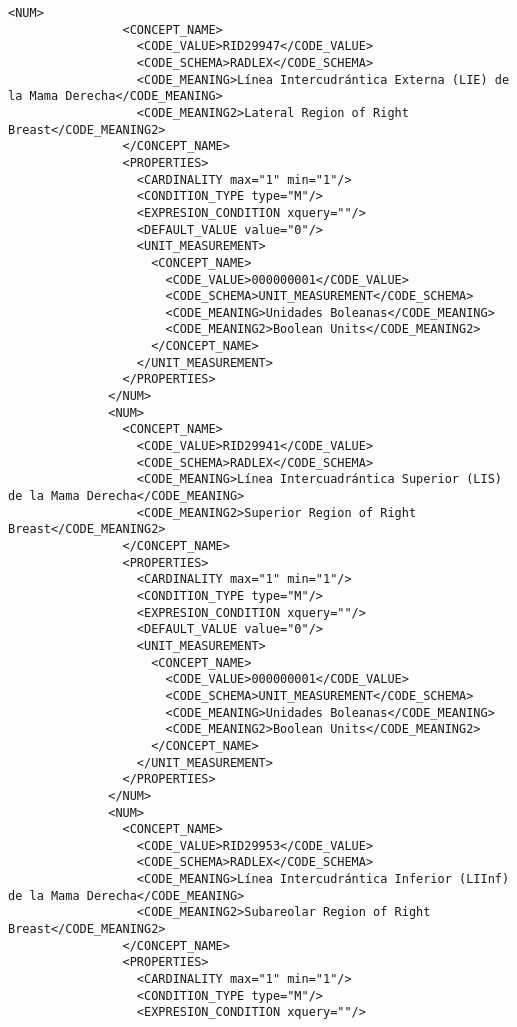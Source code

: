 \begin{lstlisting}[label=some-code,caption=Some Code]
              <NUM>
                <CONCEPT_NAME>
                  <CODE_VALUE>RID29947</CODE_VALUE>
                  <CODE_SCHEMA>RADLEX</CODE_SCHEMA>
                  <CODE_MEANING>Línea Intercudrántica Externa (LIE) de la Mama Derecha</CODE_MEANING>
                  <CODE_MEANING2>Lateral Region of Right Breast</CODE_MEANING2>
                </CONCEPT_NAME>
                <PROPERTIES>
                  <CARDINALITY max="1" min="1"/>
                  <CONDITION_TYPE type="M"/>
                  <EXPRESION_CONDITION xquery=""/>
                  <DEFAULT_VALUE value="0"/>
                  <UNIT_MEASUREMENT>
                    <CONCEPT_NAME>
                      <CODE_VALUE>000000001</CODE_VALUE>
                      <CODE_SCHEMA>UNIT_MEASUREMENT</CODE_SCHEMA>
                      <CODE_MEANING>Unidades Boleanas</CODE_MEANING>
                      <CODE_MEANING2>Boolean Units</CODE_MEANING2>
                    </CONCEPT_NAME>
                  </UNIT_MEASUREMENT>
                </PROPERTIES>
              </NUM>
              <NUM>
                <CONCEPT_NAME>
                  <CODE_VALUE>RID29941</CODE_VALUE>
                  <CODE_SCHEMA>RADLEX</CODE_SCHEMA>
                  <CODE_MEANING>Línea Intercuadrántica Superior (LIS) de la Mama Derecha</CODE_MEANING>
                  <CODE_MEANING2>Superior Region of Right Breast</CODE_MEANING2>
                </CONCEPT_NAME>
                <PROPERTIES>
                  <CARDINALITY max="1" min="1"/>
                  <CONDITION_TYPE type="M"/>
                  <EXPRESION_CONDITION xquery=""/>
                  <DEFAULT_VALUE value="0"/>
                  <UNIT_MEASUREMENT>
                    <CONCEPT_NAME>
                      <CODE_VALUE>000000001</CODE_VALUE>
                      <CODE_SCHEMA>UNIT_MEASUREMENT</CODE_SCHEMA>
                      <CODE_MEANING>Unidades Boleanas</CODE_MEANING>
                      <CODE_MEANING2>Boolean Units</CODE_MEANING2>
                    </CONCEPT_NAME>
                  </UNIT_MEASUREMENT>
                </PROPERTIES>
              </NUM>
              <NUM>
                <CONCEPT_NAME>
                  <CODE_VALUE>RID29953</CODE_VALUE>
                  <CODE_SCHEMA>RADLEX</CODE_SCHEMA>
                  <CODE_MEANING>Línea Intercudrántica Inferior (LIInf) de la Mama Derecha</CODE_MEANING>
                  <CODE_MEANING2>Subareolar Region of Right Breast</CODE_MEANING2>
                </CONCEPT_NAME>
                <PROPERTIES>
                  <CARDINALITY max="1" min="1"/>
                  <CONDITION_TYPE type="M"/>
                  <EXPRESION_CONDITION xquery=""/>

\end{lstlisting}
